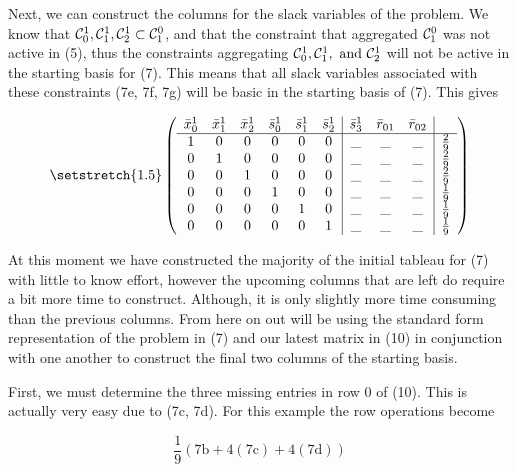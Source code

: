 \documentclass[11pt]{article} %
\newcommand{\cC}{{\cal C}}
\begin{document}
	Next, we can construct the columns for the slack variables of the problem.  We know that $\cC_0^1, \cC_1^1, \cC_2^1 \subset \cC_1^0$, and that the constraint that aggregated $\cC_1^0$ was not active in (5), thus the constraints aggregating $\cC_0^1, \cC_1^1, \ \text{and} \  \cC_2^1$ will not be active in the starting basis for (7).  This means that all slack variables associated with these constraints (7e, 7f, 7g) will be basic in the starting basis of (7).  This gives
	
	\begin{equation}\setstretch{1.5}
	\begin{pmatrix}
	\begin{array}{cccccc|ccc|c}
	\bar{x}^1_0 & \bar{x}^1_1 & \bar{x}^1_2 & \bar{s}^1_0 & \bar{s}^1_1 & \bar{s}^1_2 & \bar{s}^1_3 & \bar{r}_{01} & \bar{r}_{02} \\
	\hline
	1 & 0 & 0 & 0 & 0 & 0 & \_ & \_ & \_ & \frac{2}{9} \\ 
	0 & 1 & 0 & 0 & 0 & 0 & \_ & \_ & \_ & \frac{2}{9} \\ 
	0 & 0 & 1 & 0 & 0 & 0 & \_ & \_ & \_ & \frac{2}{9} \\ 
	0 & 0 & 0 & 1 & 0 & 0 &\_ & \_ & \_ & \frac{1}{9} \\ 
	0 & 0 & 0 & 0 & 1 & 0 &\_ & \_ & \_ & \frac{1}{9} \\
	0 & 0 & 0 & 0 & 0 & 1 & \_ & \_ & \_ & \frac{1}{9} \\
	\end{array}
	\end{pmatrix}
	\end{equation}
	
	At this moment we have constructed the majority of the initial tableau for (7) with little to know effort, however the upcoming columns that are left do require a bit more time to construct.  Although, it is only slightly more time consuming than the previous columns.  From here on out will be using the standard form representation of the problem in (7) and our latest matrix in (10) in conjunction with one another to construct the final two columns of the starting basis.	
	
	First, we must determine the three missing entries in row 0 of (10).  This is actually very easy due to (7c, 7d).  For this example the row operations become
	
	\begin{equation}
	\frac{1}{9}(7\text{b} + 4(7\text{c}) + 4(7\text{d}))
	\end{equation}   
	
\end{document}
